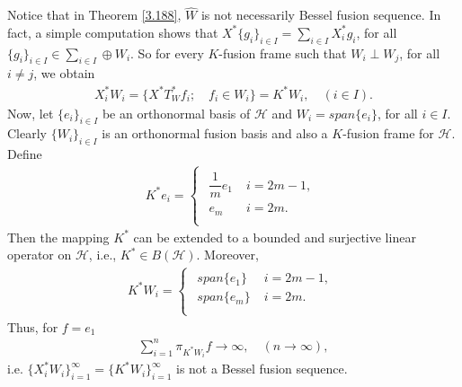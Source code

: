 \documentclass{birkjour}
\theoremstyle{definition}
\theoremstyle{remark}
\numberwithin{equation}{section}
\begin{document}
Notice that in Theorem \ref{3.188}, $\widehat{W}$ is not necessarily Bessel fusion sequence. In fact, 
a simple computation shows that $X^{*}\{g_{i}\}_{i\in I}= \sum_{i\in I}X_{i}^{*}g_{i}$, for all $\{g_{i}\}_{i\in I}\in \sum_{i\in I}\oplus W_{i}$. So for every $K$-fusion frame such that $W_{i}\perp W_{j}$, for all $i\neq j$, we obtain 
\begin{eqnarray*}
X_{i}^{*}W_{i} = \{X^{*}T_{W}^{*}f_{i}; \quad f_{i}\in W_{i}\} = K^{*}W_{i}, \quad (i\in I).
\end{eqnarray*}
 Now, let  $\lbrace e_{i}\rbrace_{i\in I}$ be an
orthonormal basis of $\mathcal{H}$ and $W_{i} = span\{e_{i}\}$, for all $i\in I$.
Clearly $\lbrace W_{i}\rbrace_{i\in I}$ is an orthonormal fusion basis and also a $K$-fusion frame for $\mathcal{H}$. Define
\begin{eqnarray*}
K^{*}e_{i} =\begin{cases}
\begin{array}{ccc}
\dfrac{1}{m}e_{1}& \;
{i=2m-1}, \\
e_{m}& \; {i=2m}. \\
\end{array}
\end{cases}
\end{eqnarray*}
Then the mapping $K^{*}$ can be extended to a bounded and surjective linear operator on $\mathcal{H}$,
i.e., $K^{*}\in B(\mathcal{H})$. Moreover,
\begin{eqnarray*}
K^{*}W_{i} =\begin{cases}
\begin{array}{ccc}
span\{e_{1}\}& \;
{i=2m-1}, \\
span\{e_{m}\}& \; {i=2m}. \\
\end{array}
\end{cases}
\end{eqnarray*}
Thus,  for $f=e_{1}$
\begin{eqnarray*}
\sum_{i=1}^{n}\pi_{K^{*}W_{i}}f \rightarrow \infty, \quad (n\rightarrow \infty),
\end{eqnarray*}
i.e. $
\lbrace X_{i}^{*}W_{i} \rbrace_{i=1}^{\infty}  =\lbrace K^{*}W_{i} \rbrace_{i=1}^{\infty}$ is not a Bessel fusion sequence.
\end{document}
